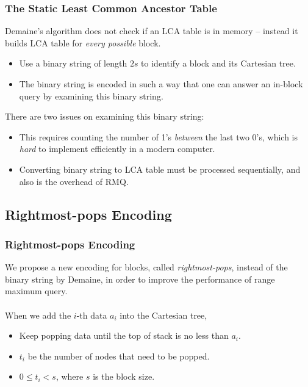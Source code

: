 \begin{frame}
	\frametitle{The Static Least Common Ancestor Table}
	Demaine's algorithm does not check if an LCA table is in memory --
	instead it builds LCA table for {\em every possible} block.
	\begin{itemize}
		\setlength\itemsep{1em}
		\item 
			Use a binary string of length $2s$ to identify a block and
			its Cartesian tree.
		\item
			The binary string is encoded in such a way that one can
			answer an in-block query by examining this binary string.
	\end{itemize}
\end{frame}

\begin{frame}
	There are two issues on examining this binary string:
	\begin{itemize}
		\setlength\itemsep{1em}
		\item 
			This requires counting the number of 1's {\em between} the
			last two 0's, which is {\em hard} to implement efficiently
			in a modern computer.
		\item
			Converting binary string to LCA table must be processed
			sequentially, and also is the overhead of RMQ.
	\end{itemize}
\end{frame}

\subsection{Rightmost-pops Encoding}
\begin{frame}
    \frametitle{Rightmost-pops Encoding}
    We propose a new encoding for blocks, called {\em rightmost-pops},
	instead of the binary string by Demaine, in order to improve the
	performance of range maximum query.
	\\~\\
	When we add the $i$-th data $a_i$ into the Cartesian tree, 
	\begin{itemize}
		\setlength\itemsep{1em}
		\item
			Keep popping data until the top of stack is no less than
			$a_i$.
		\item 
			$t_i$ be the number of nodes that need to be popped.
		\item
			$0 \le t_i < s$, where $s$ is the block size.
	\end{itemize}

\end{frame}

